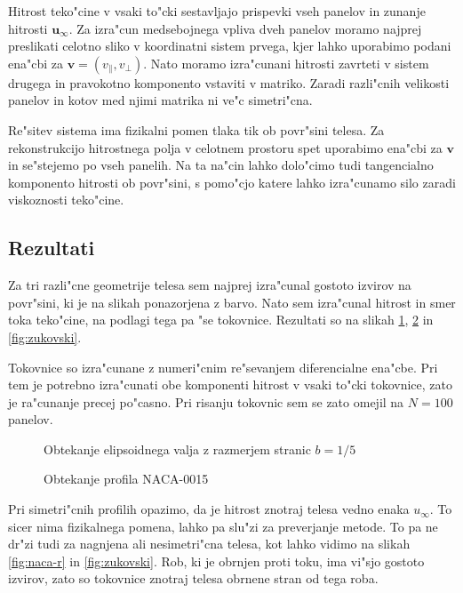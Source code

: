 \documentclass[a4paper,10pt]{article}
\renewcommand{\vec}{\mathbf}
\begin{document}
Hitrost teko"cine v vsaki to"cki sestavljajo prispevki vseh panelov in zunanje hitrosti $\vec u_\infty$. Za izra"cun medsebojnega vpliva dveh panelov moramo najprej preslikati celotno sliko v koordinatni sistem prvega, kjer lahko uporabimo podani ena"cbi za $\vec v = (v_\parallel,v_\perp)$. Nato moramo izra"cunani hitrosti zavrteti v sistem drugega in pravokotno komponento vstaviti v matriko. Zaradi razli"cnih velikosti panelov in kotov med njimi matrika ni ve"c simetri"cna. 

Re"sitev sistema ima fizikalni pomen tlaka tik ob povr"sini telesa. Za rekonstrukcijo hitrostnega polja v celotnem prostoru spet uporabimo ena"cbi za $\vec v$ in se"stejemo po vseh panelih. Na ta na"cin lahko dolo"cimo tudi tangencialno komponento hitrosti ob povr"sini, s pomo"cjo katere lahko izra"cunamo silo zaradi viskoznosti teko"cine. 

\subsection{Rezultati}

Za tri razli"cne geometrije telesa sem najprej izra"cunal gostoto izvirov na povr"sini, ki je na slikah ponazorjena z barvo. Nato sem izra"cunal hitrost in smer toka teko"cine, na podlagi tega pa "se tokovnice. Rezultati so na slikah \ref{fig:elipsoid}, \ref{fig:naca} in \ref{fig:zukovski}. 

Tokovnice so izra"cunane z numeri"cnim re"sevanjem diferencialne ena"cbe. Pri tem je potrebno izra"cunati obe komponenti hitrost v vsaki to"cki tokovnice, zato je ra"cunanje precej po"casno. Pri risanju tokovnic sem se zato omejil na $N=100$ panelov. 

\begin{figure}[H]
 \subfigure{}
 \subfigure{}
 \caption{Obtekanje elipsoidnega valja z razmerjem stranic $b = 1/5$}
 \label{fig:elipsoid}
\end{figure}

\begin{figure}[H]
 \subfigure{}
 \subfigure{}
 \caption{Obtekanje profila NACA-0015}
 \label{fig:naca}
\end{figure}

Pri simetri"cnih profilih opazimo, da je hitrost znotraj telesa vedno enaka $u_\infty$. To sicer nima fizikalnega pomena, lahko pa slu"zi za preverjanje metode. To pa ne dr"zi tudi za nagnjena ali nesimetri"cna telesa, kot lahko vidimo na slikah \ref{fig:naca-r} in \ref{fig:zukovski}. Rob, ki je obrnjen proti toku, ima vi"sjo gostoto izvirov, zato so tokovnice znotraj telesa obrnene stran od tega roba. 
\end{document}
